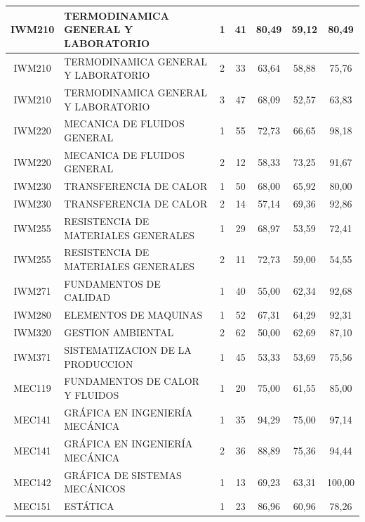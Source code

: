 \documentclass[12pt]{article}
\begin{document}
\begin{table}[H]
{\begin{tabular}{|c|l|c|c|c|c|c|}
\rowcolor[HTML]{DAEBFB} 
IWM210 & TERMODINAMICA GENERAL Y LABORATORIO & 1 & 41 & 80,49 & 59,12 & 80,49 \\ \hline
\rowcolor[HTML]{DAEBFB} 
IWM210 & TERMODINAMICA GENERAL Y LABORATORIO & 2 & 33 & 63,64 & 58,88 & 75,76 \\ \hline
\rowcolor[HTML]{DAEBFB} 
IWM210 & TERMODINAMICA GENERAL Y LABORATORIO & 3 & 47 & 68,09 & 52,57 & 63,83 \\ \hline
\rowcolor[HTML]{DAEBFB} 
IWM220 & MECANICA DE FLUIDOS GENERAL & 1 & 55 & 72,73 & 66,65 & 98,18 \\ \hline
\rowcolor[HTML]{DAEBFB} 
IWM220 & MECANICA DE FLUIDOS GENERAL & 2 & 12 & 58,33 & 73,25 & 91,67 \\ \hline
\rowcolor[HTML]{DAEBFB} 
IWM230 & TRANSFERENCIA DE CALOR & 1 & 50 & 68,00 & 65,92 & 80,00 \\ \hline
\rowcolor[HTML]{DAEBFB} 
IWM230 & TRANSFERENCIA DE CALOR & 2 & 14 & 57,14 & 69,36 & 92,86 \\ \hline
\rowcolor[HTML]{DAEBFB} 
IWM255 & RESISTENCIA DE MATERIALES GENERALES & 1 & 29 & 68,97 & 53,59 & 72,41 \\ \hline
\rowcolor[HTML]{DAEBFB} 
IWM255 & RESISTENCIA DE MATERIALES GENERALES & 2 & 11 & 72,73 & 59,00 & 54,55 \\ \hline
\rowcolor[HTML]{DAEBFB} 
IWM271 & FUNDAMENTOS DE CALIDAD & 1 & 40 & 55,00 & 62,34 & 92,68 \\ \hline
\rowcolor[HTML]{DAEBFB} 
IWM280 & ELEMENTOS DE MAQUINAS & 1 & 52 & 67,31 & 64,29 & 92,31 \\ \hline
\rowcolor[HTML]{DAEBFB} 
IWM320 & GESTION AMBIENTAL & 2 & 62 & 50,00 & 62,69 & 87,10 \\ \hline
\rowcolor[HTML]{DAEBFB} 
IWM371 & SISTEMATIZACION DE LA PRODUCCION & 1 & 45 & 53,33 & 53,69 & 75,56 \\ \hline
\rowcolor[HTML]{DAEBFB} 
MEC119 & FUNDAMENTOS DE CALOR Y FLUIDOS & 1 & 20 & 75,00 & 61,55 & 85,00 \\ \hline
\rowcolor[HTML]{DAEBFB} 
MEC141 & GRÁFICA EN INGENIERÍA MECÁNICA & 1 & 35 & 94,29 & 75,00 & 97,14 \\ \hline
\rowcolor[HTML]{DAEBFB} 
MEC141 & GRÁFICA EN INGENIERÍA MECÁNICA & 2 & 36 & 88,89 & 75,36 & 94,44 \\ \hline
\rowcolor[HTML]{DAEBFB} 
MEC142 & GRÁFICA DE SISTEMAS MECÁNICOS & 1 & 13 & 69,23 & 63,31 & 100,00 \\ \hline
\rowcolor[HTML]{DAEBFB} 
MEC151 & ESTÁTICA & 1 & 23 & 86,96 & 60,96 & 78,26 \\ \hline

\end{tabular}}
\end{table}
\end{document}
